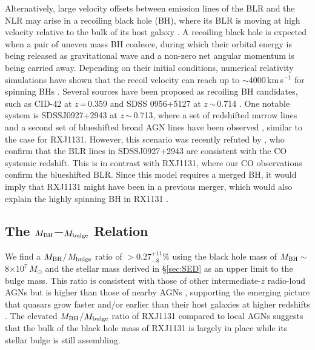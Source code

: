 \documentclass[]{emulateapj}
\newcommand{\mbulge}{\mbox{$M_{\rm bulge}$}\xspace}
\newcommand{\Msun}{\mbox{$M_{\odot}$}\xspace}
\newcommand{\kms}{\mbox{km\,s$^{-1}$}\xspace}
\newcommand{\E}[1]{\mbox{$\times10^{#1}$}}
\newcommand{\petm}[2]{$^{+#1}_{-#2}$}
\newcommand{\ssim}{\,$\sim$\,}
\newcommand{\eg}{{e.g.,~}}
\newcommand{\Sec}[1]{\S\ref{sec:#1}}
\begin{document}
Alternatively, large velocity offsets between emission lines of the
BLR and the NLR may arise in a recoiling black hole (BH),
where its BLR is moving at high velocity relative to the bulk of its host galaxy
\citep{Madau04a, Bonning07a, Loeb07a}.
A recoiling black hole is expected
when a pair of uneven mass BH coalesce, during which their orbital energy is being released
as gravitational wave and a
non-zero net angular momentum is being carried away.
Depending on their initial conditions, numerical relativity simulations have shown that
the recoil velocity can reach up to $\sim$4000\,\kms for spinning BHs \citep[\eg][]{Campanelli07a}.
Several sources have been proposed as recoiling BH candidates, such as CID-42 at $z$\,=\,0.359 \citep{Civano10a} and
SDSS 0956+5127 at $z$\,$\sim$\,0.714 \citep{Steinhardt12a}.
One notable system is SDSSJ0927+2943 at $z$\,$\sim$\,0.713, where
a set of redshifted narrow lines and a second set of blueshifted broad AGN lines
have been observed \citep{Komossa08a},  similar to the case for RXJ1131.
However, this scenario was recently refuted by \citet{Decarli14a}, who confirm that the
BLR lines in SDSSJ0927+2943 are consistent with the CO systemic redshift.
This is in contrast with RXJ1131, where our CO observations confirm the blueshifted BLR.
Since this model requires a merged BH, it would imply that RXJ1131 might
have been in a previous merger, which would also explain
the highly spinning BH in RX1131 \citep[$a$\ssim0.9;][]{Reis14a}.

\subsection{The $M_{\rm BH}$$-$\mbulge Relation}
We find a $M_{\rm BH}$$/$$M_{\rm bulge}$ ratio of $>$0.27\petm{11}{8}\%
using the black hole mass of $M_{\rm BH}$\ssim8\E{7}\,\Msun \citep{Sluse12a}
and the stellar mass derived in \Sec{SED} as an upper limit to the bulge mass.
This ratio is consistent with those of other intermediate-$z$ radio-loud AGNs \citep{McLure06a}
but is higher than those of nearby AGNs \citep{HR04a}, supporting
the emerging picture that quasars
grow faster and/or earlier than their host galaxies at higher redshifts \citep[e.g., ][]{Walter04a, Peng06a, McLure06a,Riechers08a}.
The elevated $M_{\rm BH}$$/$$M_{\rm bulge}$ ratio of RXJ1131 compared to local AGNs
suggests that the bulk of the black hole mass of RXJ1131 is largely in place while its stellar bulge is still assembling.
\end{document}
